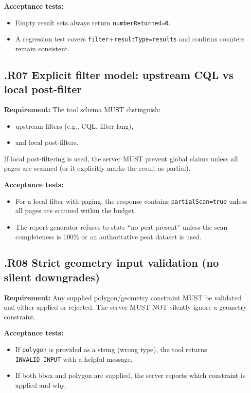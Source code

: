 \textbf{Acceptance tests:}
\begin{itemize}[leftmargin=*]
\item Empty result sets always return \texttt{numberReturned=0}.
\item A regression test covers \texttt{filter}+\texttt{resultType=results} and confirms counters remain consistent.
\end{itemize}

\subsection*{\thesection.R07 Explicit filter model: upstream CQL vs local post-filter}
\textbf{Requirement:} The tool schema MUST distinguish: \cite{prov_dm,algorithmic_transparency_recording_standard,owasp_llm_top10}
\begin{itemize}[leftmargin=*]
\item upstream filters (e.g., CQL, filter-lang),
\item and local post-filters.
\end{itemize}
If local post-filtering is used, the server MUST prevent global claims unless all pages are scanned (or it explicitly marks the result as partial).

\textbf{Acceptance tests:}
\begin{itemize}[leftmargin=*]
\item For a local filter with paging, the response contains \texttt{partialScan=true} unless all pages are scanned within the budget.
\item The report generator refuses to state “no peat present” unless the scan completeness is 100\% or an authoritative peat dataset is used.
\end{itemize}

\subsection*{\thesection.R08 Strict geometry input validation (no silent downgrades)}
\textbf{Requirement:} Any supplied polygon/geometry constraint MUST be validated and either applied or rejected. The server MUST NOT silently ignore a geometry constraint. \cite{ncsc_secure_ai_guidelines,owasp_llm_top10}

\textbf{Acceptance tests:}
\begin{itemize}[leftmargin=*]
\item If \texttt{polygon} is provided as a string (wrong type), the tool returns \texttt{INVALID\_INPUT} with a helpful message.
\item If both bbox and polygon are supplied, the server reports which constraint is applied and why.
\end{itemize}

